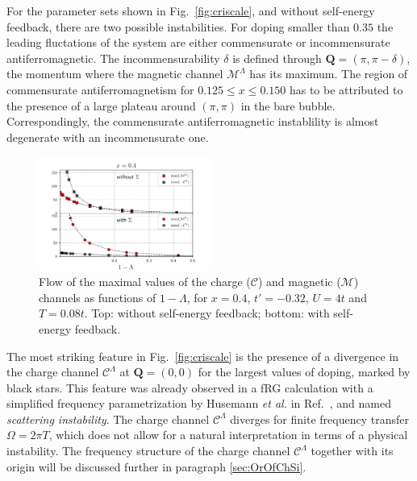 For the parameter sets shown in Fig.~\ref{fig:criscale}, and without self-energy feedback, there are two possible instabilities. 
For doping smaller than $0.35$ the leading fluctations of the system are either commensurate or incommensurate antiferromagnetic.
The incommensurability $\delta$ is defined through $\mathbf{Q}=(\pi,\pi-\delta)$, the momentum where the magnetic channel $\mathcal{M}^\Lambda$ has its maximum. 
The region of commensurate antiferromagnetism for $0.125\le x \le 0.150$ has to be attributed to the presence of a large plateau around $(\pi,\pi)$ in the bare bubble. Correspondingly, the commensurate antiferromagnetic instablility is almost degenerate with an incommensurate one.
%
\begin{figure}
\includegraphics[width=0.50\textwidth]{images/chargeproblem_MC_vs_Lambda_fix_occ.png}
\caption{Flow of the maximal values of the charge ($\mathcal{C}$) and magnetic ($\mathcal{M}$) channels as functions of $1-\Lambda$, for  $x=0.4$, $t'=-0.32$, $U=4t$ and $T=0.08t$.  Top: without self-energy feedback; bottom: with self-energy feedback. }
\label{fig:chargeproblem}
\end{figure}
%

The most striking feature in Fig.~\ref{fig:criscale} is the presence of a divergence in the charge channel $\mathcal{C}^\Lambda$ at $\mathbf{Q}=(0,0)$ for the largest values of doping, marked by black stars. 
This feature was already observed in a fRG calculation with a simplified frequency parametrization by Husemann \textit{et al.} in Ref.~, and named \textit{scattering instability}. 
The charge channel $\mathcal{C}^\Lambda$ diverges for finite frequency transfer $\Omega=2\pi T$, which does not allow for a natural interpretation in terms of a physical instability. 
The frequency structure of the charge channel $\mathcal{C}^\Lambda$ together with its origin will be discussed further in paragraph \ref{sec:OrOfChSi}.


